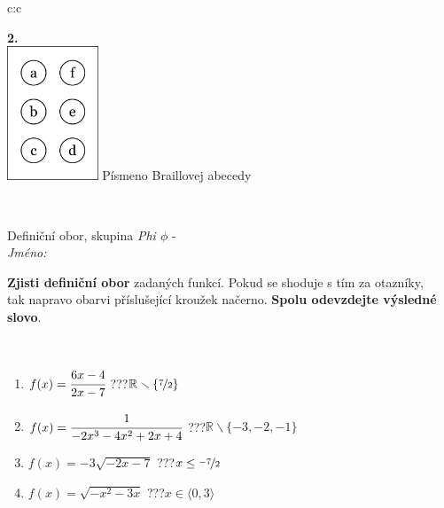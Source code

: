 \documentclass[10pt]{report}
\begin{document}
\begin{tabular}{c:c}
\begin{minipage}[c][104.5mm][t]{0.5\linewidth}
\begin{center}
\begin{minipage}{0.20\linewidth}
\begin{center}
{\Huge\bfseries 2.} \\[2mm]
\includegraphics[height=40mm]{../images/braille.png}
{\small Písmeno Braillovej abecedy}
\end{center}
\end{minipage}
\end{center}
\end{minipage}
\\ \hdashline
\begin{minipage}[c][104.5mm][t]{0.5\linewidth}
\begin{center}
\vspace{7mm}
{\huge Definiční obor, skupina \textit{Phi $\phi$} -}\\[5mm]
\textit{Jméno:}\phantom{xxxxxxxxxxxxxxxxxxxxxxxxxxxxxxxxxxxxxxxxxxxxxxxxxxxxxxxxxxxxxxxxx}\\[5mm]
\begin{minipage}{0.95\linewidth}
\begin{center}
\textbf{Zjisti definiční obor} zadaných funkcí. Pokud se shoduje s tím za otazníky,\\tak napravo obarvi příslušející kroužek načerno. \textbf{Spolu odevzdejte výsledné slovo}.
\end{center}
\end{minipage}
\\[1mm]
\begin{minipage}{0.79\linewidth}
\begin{center}
\begin{varwidth}{\linewidth}
\begin{enumerate}
\normalsizerrr
\item $f(x)=\cfrac{6x-4}{2x-7}$\quad \dotfill\; ???\;\dotfill \quad $\mathbb{R}\smallsetminus\{\nicefrac{7}{2}\}$
\item $f(x)=\cfrac{1}{-2x^3-4x^2+2x+4}$\quad \dotfill\; ???\;\dotfill \quad $\mathbb{R}\smallsetminus\{-3,-2,-1\}$
\item $f(x)=-3\sqrt{-2x-7}$\quad \dotfill\; ???\;\dotfill \quad $x\leq\nicefrac{-7}{2}$
\item $f(x)=\sqrt{-x^2-3x}$\quad \dotfill\; ???\;\dotfill \quad $x\in\langle0 , 3\rangle$

\end{enumerate}
\end{varwidth}
\end{center}
\end{minipage}
\end{center}
\end{minipage}
\end{tabular}
\end{document}
